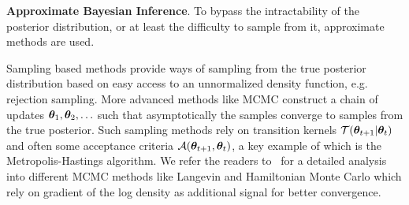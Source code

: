 \textbf{Approximate Bayesian Inference}. To bypass the intractability of the posterior distribution, or at least the difficulty to sample from it, approximate methods are used. 

Sampling based methods provide ways of sampling from the true posterior distribution based on easy access to an unnormalized density function, e.g. rejection sampling. More advanced methods like  MCMC construct a chain of updates ${\bm{\theta}}_1, {\bm{\theta}}_2, \ldots$ such that asymptotically the samples converge to samples from the true posterior. Such sampling methods rely on transition kernels ${\mathcal{T}}({\bm{\theta}}_{t+1} | {\bm{\theta}}_t)$ and often some acceptance criteria ${\mathcal{A}}({\bm{\theta}}_{t+1}, {\bm{\theta}}_t)$, a key example of which is the Metropolis-Hastings algorithm. We refer the readers to~\citep{hoffman2014no,welling2011bayesian} for a detailed analysis into different MCMC methods like Langevin and Hamiltonian Monte Carlo which rely on gradient of the log density as additional signal for better convergence.

